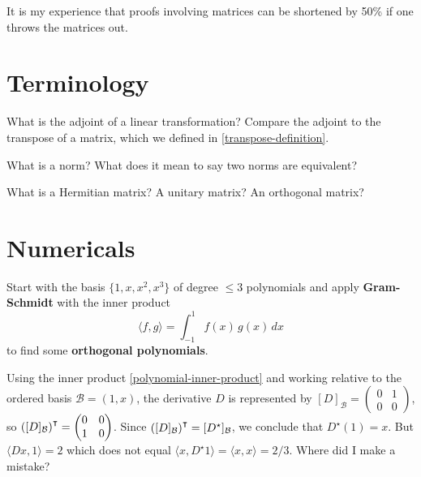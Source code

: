 \documentclass{homework}
\author{Jim Fowler}
\begin{document}
\maketitle

\begin{inspiration}
It is my experience that proofs involving matrices can be shortened by 50\% if one throws the matrices out.
\end{inspiration}

\section{Terminology}

\begin{problem}
  What is the adjoint of a linear transformation?  Compare the adjoint
  to the transpose of a matrix, which we defined in
  \ref{transpose-definition}.
\end{problem}

\begin{problem}
  What is a norm?  What does it mean to say two norms are equivalent?
\end{problem}

\begin{problem}
  What is a Hermitian matrix?  A unitary matrix?  An orthogonal matrix?
\end{problem}

\section{Numericals}

\begin{problem}\label{legendre-inner-product}Start with the basis $\{1,x,x^2,x^3\}$ of degree $\leq 3$
  polynomials and apply \textbf{Gram-Schmidt} with the inner product
  \begin{equation}\label{polynomial-inner-product}\tag{$*$}
    \langle f,g \rangle = \int_{-1}^1 f(x) \, g(x) \, dx
  \end{equation}
  to find some \textbf{orthogonal polynomials}.  
\end{problem}

\begin{problem}
  Using the inner product \eqref{polynomial-inner-product} and working relative to the ordered basis $\mathcal{B} = (1,x)$, the derivative $D$ is represented by  $[D]_{\mathcal{B}} = \begin{pmatrix} 0 & 1 \\ 0 & 0 \end{pmatrix}$, so $\left( [D]_{\mathcal{B}}\right)^\intercal = \begin{pmatrix} 0 & 0 \\ 1 & 0 \end{pmatrix}$.  Since $\left( [D]_{\mathcal{B}}\right)^\intercal = [D^\star]_{\mathcal{B}}$, we conclude that $D^\star(1) = x$.  But $\langle D x, 1 \rangle = 2$ which does not equal $\langle x, D^\star 1 \rangle = \langle x, x \rangle = 2/3$. 
  Where did I make a mistake?
\end{problem}
\end{document}
